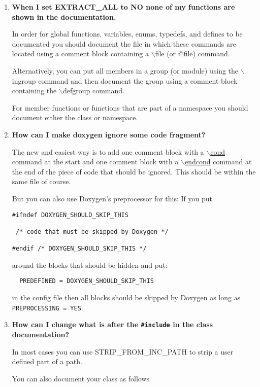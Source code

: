 \begin{enumerate}
\item {\bf When I set EXTRACT\_\-ALL to NO none of my functions are shown in the documentation.}

In order for global functions, variables, enums, typedefs, and defines to be documented you should document the file in which these commands are located using a comment block containing a $\backslash$file (or @file) command.

Alternatively, you can put all members in a group (or module) using the $\backslash$ingroup command and then document the group using a comment block containing the $\backslash$defgroup command.

For member functions or functions that are part of a namespace you should document either the class or namespace.

\item {\bf How can I make doxygen ignore some code fragment?}

The new and easiest way is to add one comment block with a \hyperlink{commands_cmdcond}{$\backslash$cond} command at the start and one comment block with a \hyperlink{commands_cmdendcond}{$\backslash$endcond} command at the end of the piece of code that should be ignored. This should be within the same file of course.

But you can also use Doxygen's preprocessor for this: If you put 

\footnotesize\begin{verbatim}
#ifndef DOXYGEN_SHOULD_SKIP_THIS

 /* code that must be skipped by Doxygen */

#endif /* DOXYGEN_SHOULD_SKIP_THIS */
\end{verbatim}
\normalsize
 around the blocks that should be hidden and put: 

\footnotesize\begin{verbatim}
  PREDEFINED = DOXYGEN_SHOULD_SKIP_THIS
\end{verbatim}
\normalsize
 in the config file then all blocks should be skipped by Doxygen as long as {\tt PREPROCESSING = YES}.

\item {\bf How can I change what is after the {\tt \#include} in the class documentation?}

In most cases you can use STRIP\_\-FROM\_\-INC\_\-PATH to strip a user defined part of a path.

You can also document your class as follows




\end{enumerate}
